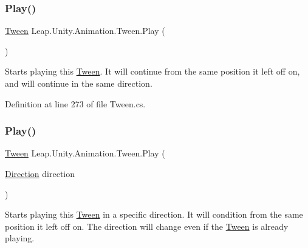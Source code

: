 \mbox{\label{struct_leap_1_1_unity_1_1_animation_1_1_tween_a00ec83a05cb0637fc0bcc24e8703c572}} 
\subsubsection{\texorpdfstring{Play()}{Play()}\hspace{0.1cm}{\footnotesize\ttfamily [1/3]}}
{\footnotesize\ttfamily \mbox{\hyperlink{struct_leap_1_1_unity_1_1_animation_1_1_tween}{Tween}} Leap.\+Unity.\+Animation.\+Tween.\+Play (\begin{DoxyParamCaption}{ }\end{DoxyParamCaption})}



Starts playing this \mbox{\hyperlink{struct_leap_1_1_unity_1_1_animation_1_1_tween}{Tween}}. It will continue from the same position it left off on, and will continue in the same direction. 



Definition at line 273 of file Tween.\+cs.

\mbox{\label{struct_leap_1_1_unity_1_1_animation_1_1_tween_a1428d270a9c131173d13fe41c0728088}} 
\subsubsection{\texorpdfstring{Play()}{Play()}\hspace{0.1cm}{\footnotesize\ttfamily [2/3]}}
{\footnotesize\ttfamily \mbox{\hyperlink{struct_leap_1_1_unity_1_1_animation_1_1_tween}{Tween}} Leap.\+Unity.\+Animation.\+Tween.\+Play (\begin{DoxyParamCaption}\item[{\mbox{\hyperlink{namespace_leap_1_1_unity_1_1_animation_ab080d4756e4d3d6a2fc9cd9a7f4e695a}{Direction}}}]{direction }\end{DoxyParamCaption})}



Starts playing this \mbox{\hyperlink{struct_leap_1_1_unity_1_1_animation_1_1_tween}{Tween}} in a specific direction. It will condition from the same position it left off on. The direction will change even if the \mbox{\hyperlink{struct_leap_1_1_unity_1_1_animation_1_1_tween}{Tween}} is already playing. 



